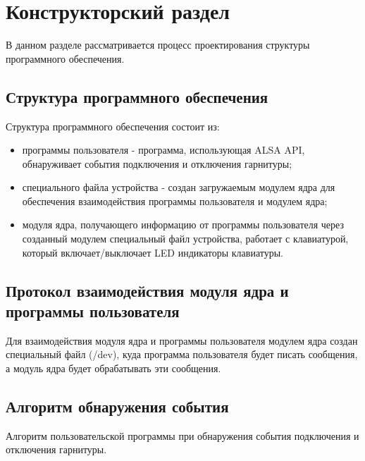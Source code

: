 \section{Конструкторский раздел}
В данном разделе рассматривается процесс проектирования структуры программного обеспечения.

\subsection{Структура программного обеспечения}

Структура программного обеспечения состоит из:

\begin{itemize}
\item программы пользователя - программа, использующая ALSA API, обнаруживает события подключения и отключения гарнитуры;

\item специального файла устройства - создан загружаемым модулем ядра для обеспечения взаимодействия программы пользователя и модулем ядра;

\item модуля ядра, получающего информацию от программы пользователя через созданный модулем специальный файл устройства, работает с клавиатурой, который включает/выключает LED индикаторы клавиатуры.\\

\end{itemize}

\subsection{Протокол взаимодействия модуля ядра и программы пользователя}
Для взаимодействия модуля ядра и программы пользователя модулем ядра создан специальный файл (/dev), куда программа пользователя будет писать сообщения, а модуль ядра будет обрабатывать эти сообщения.\newline

\subsection{Алгоритм обнаружения события}
Алгоритм пользовательской программы при обнаружения события подключения и отключения гарнитуры.\newpage


